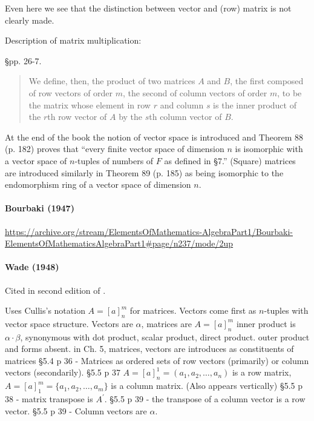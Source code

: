 Even here we see that the distinction between vector and (row) matrix is not
clearly made.

Description of matrix multiplication:

\S pp. 26-7.
\begin{quote}
    We define, then, the product of two matrices $A$ and $B$, the first composed of
    row vectors of order $m$, the second of column vectors of order $m$, to be the
    matrix whose element in row $r$ and column $s$ is the inner product of the $r$th
    row vector of $A$ by the $s$th column vector of $B$.
\end{quote}

At the end of the book the notion of vector space is introduced and Theorem 88
(p. 182) proves that ``every finite vector space of dimension $n$ is isomorphic with a
vector space of $n$-tuples of numbers of $F$ as defined in \S7.''
(Square) matrices are introduced similarly in Theorem 89 (p. 185) as being
isomorphic to the endomorphism ring of a vector space of dimension $n$.

\paragraph{Bourbaki (1947)}
\url{https://archive.org/stream/ElementsOfMathematics-AlgebraPart1/Bourbaki-ElementsOfMathematicsAlgebraPart1#page/n237/mode/2up}

\paragraph{Wade (1948)~\cite{Wade1948}}

Cited in second edition of \cite{Margenau1943}.

Uses Cullis's notation $A = {[a]}^m_n$ for matrices.
Vectors come first as $n$-tuples with vector space structure.
Vectors are $\alpha$, matrices are $A = {[a]}^m_n$
inner product is $\alpha \cdot \beta$, synonymous with dot product, scalar product, direct product.
outer product and forms absent.
in Ch. 5, matrices, vectors are introduces as constituents of matrices
\S 5.4 p 36 - Matrices as ordered sets of row vectors (primarily) or column vectors (secondarily).
\S 5.5 p 37 $A = {[a]}^1_n = (a_1, a_2, \dots, a_n)$ is a row matrix,
$A = {[a]}^m_1 = \{a_1, a_2, \dots, a_m \}$ is a column matrix. (Also appears vertically)
\S 5.5 p 38 - matrix transpose is $A^\prime$.
\S 5.5 p 39 - the transpose of a column vector is a row vector.
\S 5.5 p 39 - Column vectors are $\alpha$.



